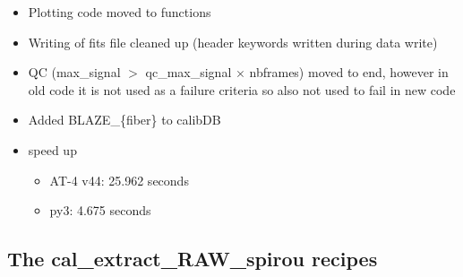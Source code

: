 \begin{itemize}
\item Plotting code moved to \spirouPlot functions

\item Writing of fits file cleaned up (header keywords written during data write)

\item QC (max\_signal $>$ qc\_max\_signal $\times$ nbframes) moved to end, however in old code it is not used as a failure criteria so also not used to fail in new code

\item Added BLAZE\_\{fiber\} to calibDB

\item speed up
	\begin{itemize}
	\item AT-4 v44: 25.962 seconds
	\item py3: 4.675 seconds
    \end{itemize}

\end{itemize}

\subsection{The cal\_extract\_RAW\_spirou recipes}
\label{ch:changelog:At4:cal_extract_RAW_spirou}

